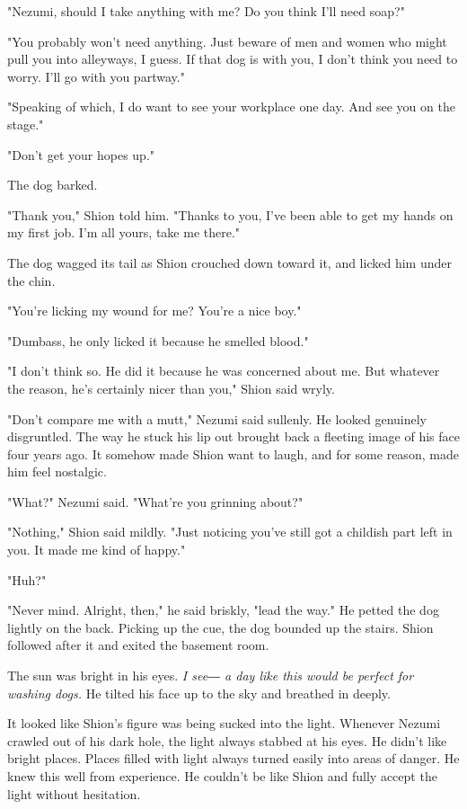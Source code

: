 "Nezumi, should I take anything with me? Do you think I'll need soap?"

"You probably won't need anything. Just beware of men and women who
might pull you into alleyways, I guess. If that dog is with you, I don't
think you need to worry. I'll go with you partway."

"Speaking of which, I do want to see your workplace one day. And see you
on the stage."

"Don't get your hopes up."

The dog barked.

"Thank you," Shion told him. "Thanks to you, I've been able to get my
hands on my first job. I'm all yours, take me there."

The dog wagged its tail as Shion crouched down toward it, and licked him
under the chin.

"You're licking my wound for me? You're a nice boy."

"Dumbass, he only licked it because he smelled blood."

"I don't think so. He did it because he was concerned about me. But
whatever the reason, he's certainly nicer than you," Shion said wryly.

"Don't compare me with a mutt," Nezumi said sullenly. He looked
genuinely disgruntled. The way he stuck his lip out brought back a
fleeting image of his face four years ago. It somehow made Shion want to
laugh, and for some reason, made him feel nostalgic.

"What?" Nezumi said. "What're you grinning about?"

"Nothing," Shion said mildly. "Just noticing you've still got a childish
part left in you. It made me kind of happy."

"Huh?"

"Never mind. Alright, then," he said briskly, "lead the way." He petted
the dog lightly on the back. Picking up the cue, the dog bounded up the
stairs. Shion followed after it and exited the basement room.

The sun was bright in his eyes.\emph{ I see― a day like this would be perfect
for washing dogs.} He tilted his face up to the sky and breathed in
deeply.

\myspace

It looked like Shion's figure was being sucked into the light. Whenever
Nezumi crawled out of his dark hole, the light always stabbed at his
eyes. He didn't like bright places. Places filled with light always
turned easily into areas of danger. He knew this well from experience.
He couldn't be like Shion and fully accept the light without hesitation.

